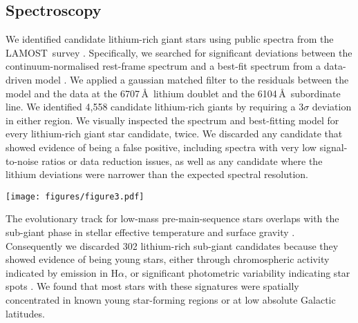 \documentclass[twocolumn]{aastex62}
\newcommand\lamost{LAMOST}
\begin{document}
\subsection{Spectroscopy}

We identified candidate lithium-rich giant stars using public spectra from 
the \lamost\ survey \citep[Data Release 2;][]{Luo_2015}. Specifically, we searched for significant
deviations between the continuum-normalised rest-frame spectrum 
and a best-fit spectrum from a data-driven model \citep[Figure~\ref{fig:spectrum};][]{Ho_2017a,Ho_2017b}. We applied a gaussian matched filter to the 
residuals between the model and the data at the 6707\,\AA\ lithium doublet 
and the 6104\,\AA\ subordinate line.  We identified 4,558 candidate 
lithium-rich giants by requiring a $3\sigma$ deviation in either region. 
We visually inspected the spectrum and best-fitting model for every 
lithium-rich giant star candidate, twice. We discarded any candidate that 
showed evidence of being a false positive, including spectra with very low
signal-to-noise ratios or data reduction issues, as well as any candidate where the lithium 
deviations were narrower than the expected spectral resolution.

\begin{figure*}
    \texttt{[image: figures/figure3.pdf]}
        \caption{A portion of the \lamost\ spectrum and best-fitting model for an example lithium-rich giant star, J055640.1+144534.
        The data are shown in black and $1\sigma$ flux uncertainties are shaded in grey. A data-driven model of a lithium-normal star is shown in red, where the quadrature sum of model and data uncertainties are shaded in red. We mark the regions surrounding the 6104\,\AA\ and 6707\,\AA\ lithium transitions where we searched for significant residuals.}
    \label{fig:spectrum}
\end{figure*} 



The evolutionary track for low-mass pre-main-sequence stars overlaps with
the sub-giant phase in stellar effective temperature and surface 
gravity \citep{Dotter_2016,Choi_2016}. Consequently we discarded 302 
lithium-rich sub-giant candidates because they showed evidence of being 
young stars, either through chromospheric activity indicated by emission 
in H$\alpha$, or significant photometric variability indicating star 
spots \citep{McQuillan_2014}. We found that most stars with these signatures were
spatially concentrated in known young star-forming regions or at low 
absolute Galactic latitudes. 
\end{document}
